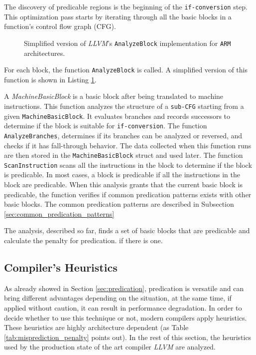 
The discovery of predicable regions is the beginning of the \texttt{if-conversion} step. This optimization pass starts by iterating through all the basic blocks in a function's control flow graph (CFG).

\begin{figure}[H]
    \centering
    
    \caption{Simplified version of \textit{LLVM}'s \texttt{AnalyzeBlock} implementation for \texttt{ARM} architectures.}
    \label{fig:analyze_block}
\end{figure}

For each block, the function \texttt{AnalyzeBlock} is called. A simplified version of this function is shown in Listing \ref{fig:analyze_block}.

A \textit{MachineBasicBlock} is a basic block after being translated to machine instructions.
This function analyzes the structure of a \texttt{sub-CFG} starting from a given \texttt{MachineBasicBlock}. It evaluates branches and records successors to determine if the block is suitable for \texttt{if-conversion}.
The function \texttt{AnalyzeBranches}, determines if its branches can be analyzed or reversed, and checks if it has fall-through behavior. The data collected when this function runs are then stored in the \texttt{MachineBasicBlock} struct and used later. The function \texttt{ScanInstruction} scans all the instructions in the block to determine if the block is predicable. In most cases, a block is predicable if all the instructions in the block are predicable. 
When this analysis grants that the current basic block is predicable, the function verifies if common predication patterns exists with other basic blocks. The common predication patterns are described in Subsection \ref{sec:common_predication_patterns}

The analysis, described so far, finds a set of basic blocks that are predicable and calculate the penalty for predication. if there is one.

\subsection{Compiler's Heuristics}
\label{sec:compiler_heuristics}

As already showed in Section \ref{sec:predication}, predication is versatile and can bring different advantages depending on the situation, at the same time, if applied without caution, it can result in performance degradation.
In order to decide whether to use this technique or not, modern compilers apply heuristics. These heuristics are highly architecture dependent (as Table \ref{tab:misprediction_penalty} points out). In the rest of this section, the heuristics used by the production state of the art compiler \textit{LLVM} are analyzed.

